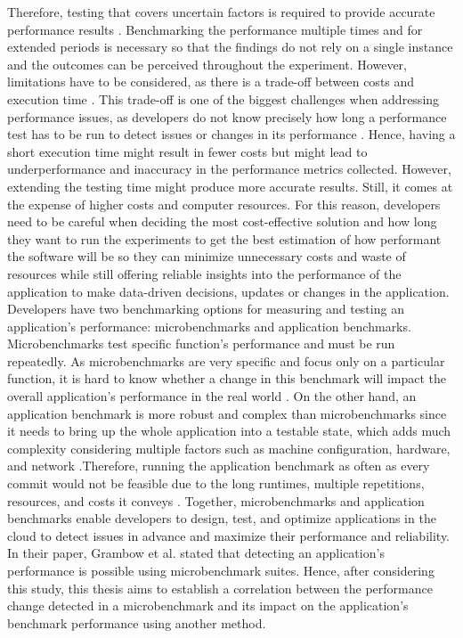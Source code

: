 Therefore, testing that covers uncertain factors is required to provide accurate performance results \cite{he2019statistics}. Benchmarking the performance multiple times and for extended periods is necessary so that the findings do not rely on a single instance and the outcomes can be perceived throughout the experiment. However, limitations have to be considered, as there is a trade-off between costs and execution time \cite{bulej2019initial, laaber2021applyingtcp, mostafa2017perfrankerprioritization}. This trade-off is one of the biggest challenges when addressing performance issues, as developers do not know precisely how long a performance test has to be run to detect issues or changes in its performance \cite{alghmadi2016automated, alghamdi2023towards}. Hence, having a short execution time might result in fewer costs but might lead to underperformance and inaccuracy in the performance metrics collected. However, extending the testing time might produce more accurate results. Still, it comes at the expense of higher costs and computer resources\cite{alghamdi2023towards, he2019statistics, bulej2019initial, bulej2020duet, grambow2020benchmarkingMicroservicesperformance, laaber2021applyingtcp}. For this reason, developers need to be careful when deciding the most cost-effective solution and how long they want to run the experiments to get the best estimation of how performant the software will be so they can minimize unnecessary costs and waste of resources while still offering reliable insights into the performance of the application to make data-driven decisions, updates or changes in the application. \\
Developers have two benchmarking options for measuring and testing an application’s performance: microbenchmarks and application benchmarks. Microbenchmarks test specific function’s performance and must be run repeatedly. As microbenchmarks are very specific and focus only on a particular function, it is hard to know whether a change in this benchmark will impact the overall application’s performance in the real world \cite{bulej2019initial, grambow, laaber2022multi}. On the other hand, an application benchmark is more robust and complex than microbenchmarks since it needs to bring up the whole application into a testable state, which adds much complexity considering multiple factors such as machine configuration, hardware, and network \cite{japke2023earlymicrobenchmarkcatches}.Therefore, running the application benchmark as often as every commit would not be feasible due to the long runtimes, multiple repetitions, resources, and costs it conveys \cite{grambow, japke2023earlymicrobenchmarkcatches, bulej2019initial}. Together, microbenchmarks and application benchmarks enable developers to design, test, and optimize applications in the cloud to detect issues in advance and maximize their performance and reliability. In their paper, Grambow et al. \cite{grambow} stated that detecting an application’s performance is possible using microbenchmark suites. Hence, after considering this study, this thesis aims to establish a correlation between the performance change detected in a microbenchmark and its impact on the application’s benchmark performance using another method. \\
